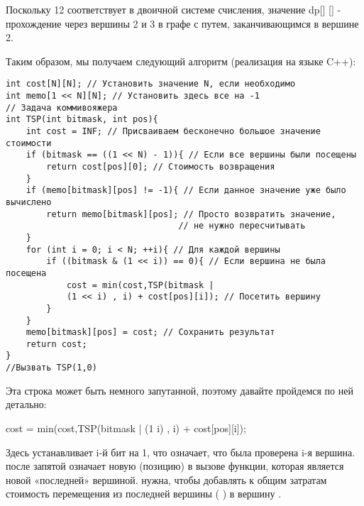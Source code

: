 \vspace{\baselineskip}
Поскольку 12 соответствует  в двоичной системе счисления, значение dp[] [] - прохождение через вершины 2 и 3 в графе с путем, заканчивающимся в вершине 2.

\vspace{\baselineskip}
Таким образом, мы получаем следующий алгоритм (реализация на языке C++):

\vspace{\baselineskip}
\begin{tcolorbox}
\begin{verbatim}
int cost[N][N]; // Установить значение N, если необходимо
int memo[1 << N][N]; // Установить здесь все на -1
// Задача коммивояжера
int TSP(int bitmask, int pos){    
	int cost = INF; // Присваиваем бесконечно большое значение стоимости    
	if (bitmask == ((1 << N) - 1)){ // Если все вершины были посещены        
		return cost[pos][0]; // Стоимость возвращения    
	}    
	if (memo[bitmask][pos] != -1){ // Если данное значение уже было вычислено        
		return memo[bitmask][pos]; // Просто возвратить значение, 
		                          // не нужно пересчитывать    
	}    
	for (int i = 0; i < N; ++i){ // Для каждой вершины        
		if ((bitmask & (1 << i)) == 0){ // Если вершина не была посещена            
			cost = min(cost,TSP(bitmask |
			(1 << i) , i) + cost[pos][i]); // Посетить вершину        
		}    
	}    
	memo[bitmask][pos] = cost; // Сохранить результат    
	return cost; 
} 
//Вызвать TSP(1,0)
\end{verbatim}
\end{tcolorbox}

\vspace{\baselineskip}
Эта строка может быть немного запутанной, поэтому давайте пройдемся по ней детально:

\vspace{\baselineskip}
\begin{tcolorbox}
cost = min(cost,TSP(bitmask | (1 \ll  i) , i) + cost[pos][i]);
\end{tcolorbox}

\vspace{\baselineskip}
Здесь  устанавливает i-й бит  на 1, что означает, что была проверена i-я вершина.  после запятой означает новую  (позицию) в вызове функции, которая является новой «последней» вершиной.  нужна, чтобы добавлять к общим затратам стоимость перемещения из последней вершины (  ) в вершину .

